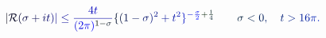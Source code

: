 \documentclass[12pt]{article}
\begin{document}
\makeatletter
\renewcommand*{\@textcolor}[3]{%
  \protect\leavevmode
  \begingroup
    \color#1{#2}#3%
  \endgroup
}
\makeatother
\begin{displaymath}
\mathcolor[RGB]{0,0,15}{|} \mathcal { \mathcolor[RGB]{0,0,30}{R} } \mathcolor[RGB]{0,0,45}{(} \mathcolor[RGB]{0,0,60}{\sigma} \mathcolor[RGB]{0,0,75}{+} \mathcolor[RGB]{0,0,90}{i} \mathcolor[RGB]{0,0,105}{t} \mathcolor[RGB]{0,0,120}{)} \mathcolor[RGB]{0,0,135}{|} \mathcolor[RGB]{0,0,150}{\leq} \mathcolor[RGB]{0,0,165}{\frac { \mathcolor[RGB]{0,0,180}{4} \mathcolor[RGB]{0,0,195}{t} } { \mathcolor[RGB]{0,0,210}{(} \mathcolor[RGB]{0,0,225}{2} \mathcolor[RGB]{0,0,240}{\pi} \mathcolor[RGB]{0,0,255}{)} ^ { \mathcolor[RGB]{0,15,0}{1} \mathcolor[RGB]{0,15,15}{-} \mathcolor[RGB]{0,15,30}{\sigma} } } } \mathcolor[RGB]{0,15,45}{\{} \mathcolor[RGB]{0,15,60}{(} \mathcolor[RGB]{0,15,75}{1} \mathcolor[RGB]{0,15,90}{-} \mathcolor[RGB]{0,15,105}{\sigma} \mathcolor[RGB]{0,15,120}{)} ^ { \mathcolor[RGB]{0,15,135}{2} } \mathcolor[RGB]{0,15,150}{+} \mathcolor[RGB]{0,15,165}{t} ^ { \mathcolor[RGB]{0,15,180}{2} } \mathcolor[RGB]{0,15,195}{\}} ^ { \mathcolor[RGB]{0,15,210}{-} \mathcolor[RGB]{0,15,225}{\frac { \mathcolor[RGB]{0,15,240}{\sigma} } { \mathcolor[RGB]{0,15,255}{2} } } \mathcolor[RGB]{0,30,0}{+} \mathcolor[RGB]{0,30,15}{\frac { \mathcolor[RGB]{0,30,30}{1} } { \mathcolor[RGB]{0,30,45}{4} } } } \qquad \mathcolor[RGB]{0,30,60}{\sigma} \mathcolor[RGB]{0,30,75}{<} \mathcolor[RGB]{0,30,90}{0} \mathcolor[RGB]{0,30,105}{,} \quad \mathcolor[RGB]{0,30,120}{t} \mathcolor[RGB]{0,30,135}{>} \mathcolor[RGB]{0,30,150}{1} \mathcolor[RGB]{0,30,165}{6} \mathcolor[RGB]{0,30,180}{\pi} \mathcolor[RGB]{0,30,195}{.}
\end{displaymath}
\end{document}
